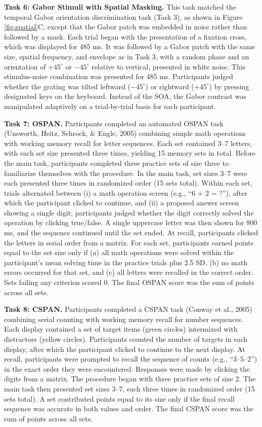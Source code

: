 \documentclass[
  ,man]{apa6}
\begin{document}
\textbf{Task 6: Gabor Stimuli with Spatial Masking.} This task matched the temporal Gabor orientation discrimination task (Task 3), as shown in Figure \ref{fig:spatial}C, except that the Gabor patch was embedded in noise rather than followed by a mask. Each trial began with the presentation of a fixation cross, which was displayed for 485 ms. It was followed by a Gabor patch with the same size, spatial frequency, and envelope as in Task 3, with a random phase and an orientation of \(+45^\circ\) or \(-45^\circ\) relative to vertical, presented in white noise. This stimulus-noise combination was presented for 485 ms. Participants judged whether the grating was tilted leftward (\(-45^\circ\)) or rightward (\(+45^\circ\)) by pressing designated keys on the keyboard. Instead of the SOA, the Gabor contrast was manipulated adaptively on a trial-by-trial basis for each participant.

\textbf{Task 7: OSPAN.} Participants completed an automated OSPAN task (Unsworth, Heitz, Schrock, \& Engle, 2005) combining simple math operations with working memory recall for letter sequences. Each set contained 3--7 letters, with each set size presented three times, yielding 15 memory sets in total. Before the main task, participants completed three practice sets of size three to familiarize themselves with the procedure. In the main task, set sizes 3--7 were each presented three times in randomized order (15 sets total). Within each set, trials alternated between (i) a math operation screen (e.g., ``6 + 2 = ?''), after which the participant clicked to continue, and (ii) a proposed answer screen showing a single digit; participants judged whether the digit correctly solved the operation by clicking true/false. A single uppercase letter was then shown for 800 ms, and the sequence continued until the set ended. At recall, participants clicked the letters in serial order from a matrix. For each set, participants earned points equal to the set size only if (a) all math operations were solved within the participant's mean solving time in the practice trials plus 2.5 SD, (b) no math errors occurred for that set, and (c) all letters were recalled in the correct order. Sets failing any criterion scored 0. The final OSPAN score was the sum of points across all sets.

\textbf{Task 8: CSPAN.} Participants completed a CSPAN task (Conway et al., 2005) combining serial counting with working memory recall for number sequences. Each display contained a set of target items (green circles) intermixed with distractors (yellow circles). Participants counted the number of targets in each display, after which the participant clicked to continue to the next display. At recall, participants were prompted to recall the sequence of counts (e.g., ``3--5--2'') in the exact order they were encountered. Responses were made by clicking the digits from a matrix. The procedure began with three practice sets of size 2. The main task then presented set sizes 3--7, each three times in randomized order (15 sets total). A set contributed points equal to its size only if the final recall sequence was accurate in both values and order. The final CSPAN score was the sum of points across all sets.
\end{document}
